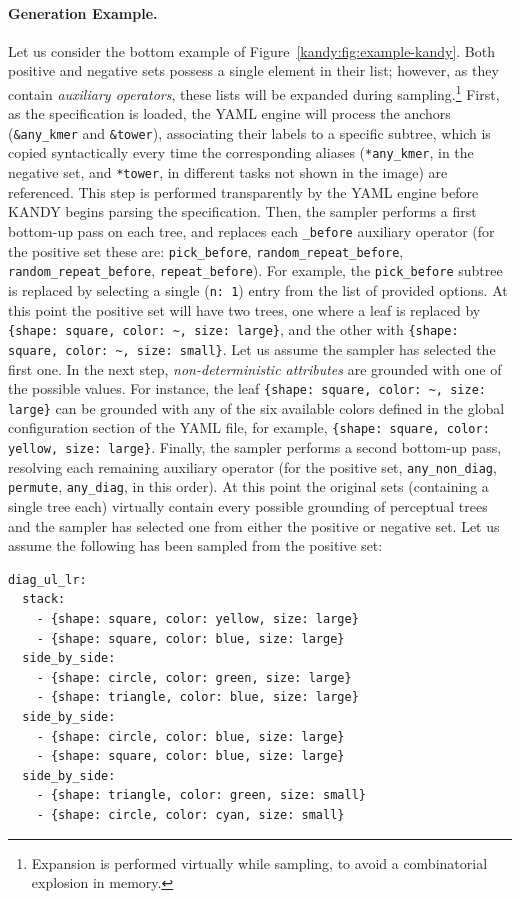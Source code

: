 \paragraph{Generation Example.} Let us consider the bottom example of Figure~\ref{kandy:fig:example-kandy}.
Both positive and negative sets possess a single element in their list; however, as they contain \textit{auxiliary operators}, these lists will be expanded during sampling.\footnote{Expansion is performed virtually while sampling, to avoid a combinatorial explosion in memory.}
%
First, as the specification is loaded, the YAML engine will process the anchors (\texttt{\&any\_kmer} and  \texttt{\&tower}), associating their labels to a specific subtree, which is copied syntactically every time the corresponding aliases (\texttt{*any\_kmer}, in the negative set, and \texttt{*tower}, in different tasks not shown in the image) are referenced. This step is performed transparently by the YAML engine before \textsc{KANDY} begins parsing the specification.
%
Then, the sampler performs a first bottom-up pass on each tree, and replaces each \texttt{\_before} auxiliary operator (for the positive set these are: \texttt{pick\_before}, \texttt{random\_repeat\_before}, \texttt{random\_repeat\_before}, \texttt{repeat\_before}). For example, the \texttt{pick\_before} subtree is replaced by selecting a single (\texttt{n: 1}) entry from the list of  provided options.
At this point the positive set will have two trees, one where a leaf is replaced by \texttt{\{shape: square, color: \textasciitilde, size: large\}}, and the other with \texttt{\{shape: square, color: \textasciitilde, size: small\}}. Let us  assume the sampler has selected the first one.
%
In the next step, \textit{non-deterministic attributes} are grounded with one of the possible values. For instance, the leaf \texttt{\{shape: square, color: \textasciitilde, size: large\}} can be grounded with any of the six available colors defined in the global configuration section of the YAML file, for  example, \texttt{\{shape: square, color: yellow, size: large\}}.
%
Finally, the sampler performs a second bottom-up pass, resolving each remaining auxiliary operator (for the positive set, \texttt{any\_non\_diag}, \texttt{permute}, \texttt{any\_diag}, in this order). At this point the original sets (containing a single tree each) virtually contain every possible grounding of perceptual trees and the sampler has selected one from either the positive or negative set. Let us assume the following has been sampled from the positive set:
\vskip 2mm
\begin{verbatim}
diag_ul_lr:
  stack:
    - {shape: square, color: yellow, size: large}
    - {shape: square, color: blue, size: large}
  side_by_side:
    - {shape: circle, color: green, size: large}
    - {shape: triangle, color: blue, size: large}
  side_by_side:
    - {shape: circle, color: blue, size: large}
    - {shape: square, color: blue, size: large}
  side_by_side:
    - {shape: triangle, color: green, size: small}
    - {shape: circle, color: cyan, size: small}  
\end{verbatim}
